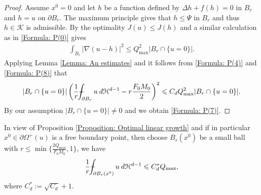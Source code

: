 \documentclass[11pt,reqno]{amsart}
\begin{document}
\begin{proof}
	Assume $x^{0}=0$ and let $h$ be a function defined by $\Delta h+f(h)=0$ in $B_{r}$ and $h=u$ on $\partial B_{r}$. The maximum principle gives that $h\leqslant\Psi$ in $B_{r}$ and thus $h\in\mathcal{K}$ is admissible. By the optimality $J(u)\leqslant J(h)$ and a similar calculation as in \eqref{Formula: P(0)} gives
	\begin{align}\label{Formula: P(8)}
		\int_{B_{r}}|\nabla(u-h)|^{2}\leqslant Q_{\mathrm{max}}^{2}|B_{r}\cap\{u=0\}|.
	\end{align}
    Applying Lemma \ref{Lemma: An estimates} and it follows from \eqref{Formula: P(4)} and \eqref{Formula: P(8)} that
    \begin{align*}
    	|B_{r}\cap\{u=0\}|\left(\frac{1}{r}\dashint_{\partial B_{r}}u\:d\mathcal{H}^{d-1}-r\frac{F_{0}M_{0}}{2}\right)^{2}\leqslant C_{d}Q_{\mathrm{max}}^{2}|B_{r}\cap\{u=0\}|.
    \end{align*}
    By our assumption $|B_{r}\cap\{u=0\}|\neq0$ and we obtain \eqref{Formula: P(7)}.
\end{proof}
\begin{remark}\label{Remark: Optimal linear growth}
	In view of Proposition \ref{Proposition: Optimal linear growth} and if in particular  $x^{0}\in\partial\varOmega^{+}(u)$ is a free boundary point, then choose $B_{r}(x^{0})$ be a small ball with $r\leqslant\min\{\frac{2Q_{\mathrm{max}}}{F_{0}M_{0}},1\}$, we have
	\begin{align*}
		\frac{1}{r}\dashint_{\partial B_{r}(x^{0})}u\:d\mathcal{H}^{d-1}\leqslant C_{d}^{*}Q_{\mathrm{max}},
	\end{align*}
    where $C_{d}^{*}:=\sqrt{C_{d}}+1$.
\end{remark}
\end{document}
